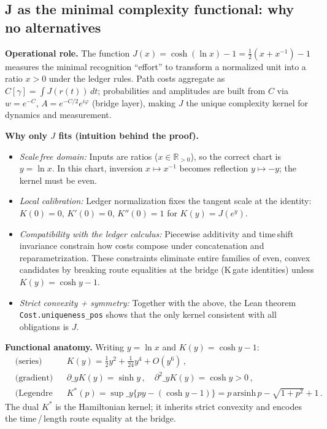 \documentclass[11pt]{article}
\begin{document}
\subsection*{J as the minimal complexity functional: why no alternatives}
\textbf{Operational role.} The function $J(x)=\cosh(\ln x)-1=\tfrac12(x+x^{-1})-1$ measures the minimal recognition “effort” to transform a normalized unit into a ratio $x>0$ under the ledger rules. Path costs aggregate as $C[\gamma]=\int J(r(t))\,dt$; probabilities and amplitudes are built from $C$ via $w=e^{-C}$, $A=e^{-C/2}e^{i\varphi}$ (bridge layer), making $J$ the unique complexity kernel for dynamics and measurement.

\textbf{Why only $J$ fits (intuition behind the proof).}
\begin{itemize}[leftmargin=*]
  \item \emph{Scale\,free domain:} Inputs are ratios ($x\in\mathbb R_{>0}$), so the correct chart is $y=\ln x$. In this chart, inversion $x\mapsto x^{-1}$ becomes reflection $y\mapsto -y$; the kernel must be even.
  \item \emph{Local calibration:} Ledger normalization fixes the tangent scale at the identity: $K(0)=0$, $K'(0)=0$, $K''(0)=1$ for $K(y)=J(e^y)$.
  \item \emph{Compatibility with the ledger calculus:} Piecewise additivity and time\,shift invariance constrain how costs compose under concatenation and reparametrization. These constraints eliminate entire families of even, convex candidates by breaking route equalities at the bridge (K\,gate identities) unless $K(y)=\cosh y - 1$.
  \item \emph{Strict convexity + symmetry:} Together with the above, the Lean theorem \texttt{Cost.uniqueness\_pos} shows that the only kernel consistent with all obligations is $J$.
\end{itemize}

\textbf{Functional anatomy.} Writing $y=\ln x$ and $K(y)=\cosh y - 1$:
\begin{align*}
  &\text{(series)} &&K(y)=\tfrac{1}{2}y^2 + \tfrac{1}{24}y^4 + O(y^6)\,,\\
  &\text{(gradient)} &&\partial\_y K(y)=\sinh y\,,\quad \partial^2\_y K(y)=\cosh y>0\,,\\
  &\text{(Legendre dual)} &&K^{\!*}(p)= \sup\_y\{py - (\cosh y - 1)\} = p\,\mathrm{arsinh}\,p - \sqrt{1+p^2} + 1\,.
\end{align*}
The dual $K^{\!*}$ is the Hamiltonian kernel; it inherits strict convexity and encodes the time\,/\,length route equality at the bridge.
\end{document}
